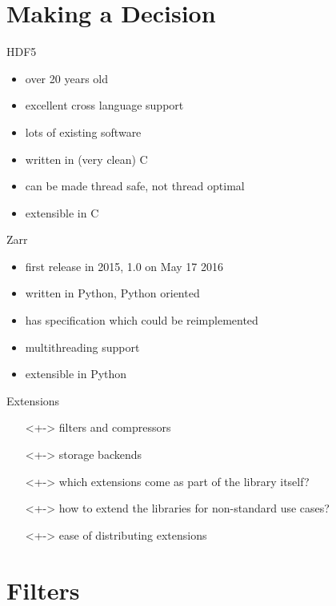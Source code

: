 \documentclass{beamer}
\begin{document}
\section{Making a Decision}

\begin{frame}{HDF5}
  \begin{itemize}
  \item<+-> over 20 years old
  \item<+-> excellent cross language support
  \item<+-> lots of existing software
  \item<+-> written in (very clean) C
  \item<+-> can be made thread safe, not thread optimal
  \item<+-> extensible in C
  \end{itemize}
\end{frame}

\begin{frame}{Zarr}
  \begin{itemize}
  \item<+-> first release in 2015, 1.0 on May 17 2016
  \item<+-> written in Python, Python oriented
  \item<+-> has specification which could be reimplemented
  \item<+-> multithreading support
  \item<+-> extensible in Python
  \end{itemize}
\end{frame}

\begin{frame}{Extensions}
  \begin{itemize}
  \item[]<+-> filters and compressors
  \item[]<+-> storage backends
  \item[]<+-> which extensions come as part of the library itself?
  \item[]<+-> how to extend the libraries for non-standard use cases?
  \item[]<+-> ease of distributing extensions
  \end{itemize}
\end{frame}

\section{Filters}
\end{document}
